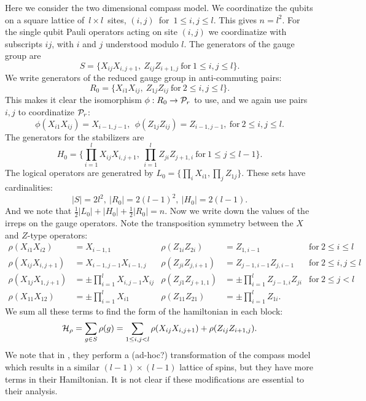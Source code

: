 \documentclass[12pt,notitlepage,longbibliography,nofootinbib,tightenlines]{revtex4}
\begin{document}
Here we consider the two dimensional compass model.
We coordinatize the qubits on a square 
lattice of\ $l\times l$\ sites,
$(i, j)$\ for\ $1\le i, j\le l.$
This gives $n = l^2.$
For the single qubit Pauli operators acting on site
$(i, j)$ we coordinatize with subscripts $ij$, 
with $i$ and $j$ understood modulo $l$.
The generators of the gauge group are
$$
    S = \big\{ X_{ij}X_{i,j+1},\ Z_{ij}Z_{i+1,j}\ \mbox{for}\ 1\le i, j\le l\big\}.
$$
We write generators of the reduced
gauge group in anti-commuting pairs:
$$
    R_0 = \big\{ X_{i1}X_{ij},\ Z_{1j}Z_{ij}\ \mbox{for}\ 2\le i, j\le l\big\}.
$$
This makes it clear the isomorphism $\phi : R_0 \to \mathcal{P}_r$ to use,
and we again use pairs $i,j$ to coordinatize $\mathcal{P}_r$:
$$
    \phi(X_{i1}X_{ij}) = X_{i-1,j-1}, \ \ \phi(Z_{1j}Z_{ij}) = Z_{i-1,j-1},\ \mbox{for}\ 2\le i, j\le l.
$$
The generators for the stabilizers are
$$
    H_0 = \big\{ \prod_{i=1}^l X_{ij}X_{i,j+1},\ \prod_{i=1}^l Z_{ji}Z_{j+1,i}\ \mbox{for}\ 1\le j\le l-1\big\}.
$$
The logical operators are generatred by $L_0 = \big\{ \prod_i X_{i1}, \prod_j Z_{1j} \}.$
These sets have cardinalities:
$$|S|=2l^2,\ |R_0| = 2(l-1)^2,\ |H_0| = 2(l-1).$$
And we note that $\frac{1}{2}|L_0| + |H_0| + \frac{1}{2}|R_0| = n.$
Now we write down the values of the
irreps on the gauge operators.
Note the transposition symmetry between the $X$ and $Z$-type operators:
\begin{align*}
\rho(X_{i1} X_{i2}) &= X_{i-1,1} &
\rho(Z_{1i} Z_{2i}) &= Z_{1,i-1} &\mbox{for}\ 2\le i\le l\\
\rho(X_{ij} X_{i,j+1}) &= X_{i-1,j-1} X_{i-1,j} &
\rho(Z_{ji} Z_{j,i+1}) &= Z_{j-1,i-1}Z_{j,i-1} &\mbox{for}\ 2\le i, j\le l\\
\rho(X_{1j} X_{1,j+1}) &= \pm \prod_{i=1}^l X_{i,j-1} X_{ij} &
\rho(Z_{j1} Z_{j+1,1}) &= \pm \prod_{i=1}^l Z_{j-1,i} Z_{ji} &\mbox{for}\ 2\le j<l\\
\rho(X_{11} X_{12}) &= \pm \prod_{i=1}^l X_{i1} &
\rho(Z_{11} Z_{21}) &= \pm \prod_{i=1}^l Z_{1i}.
\end{align*}
We sum all these terms to find 
the form of the hamiltonian in each block:
$$
\mathcal{H}_\rho = \sum_{g\in S} \rho(g) = \sum_{1\le i,j<l} \rho(X_{ij}X_{i,j+1}) + \rho(Z_{ij}Z_{i+1,j}).
$$
We note that in \cite{Brzezicki2013}, they perform a
(ad-hoc?) transformation of the compass model
which results in a similar $(l-1)\times(l-1)$ lattice
of spins, but they have more terms in their Hamiltonian.
It is not clear if these modifications are essential to
their analysis.
\end{document}
